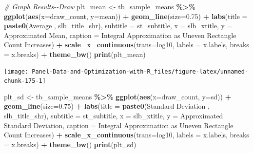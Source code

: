 \documentclass[
]{book}
\newenvironment{Shaded}{\begin{snugshade}}{\end{snugshade}}
\newcommand{\CommentTok}[1]{\textcolor[rgb]{0.56,0.35,0.01}{\textit{#1}}}
\newcommand{\DataTypeTok}[1]{\textcolor[rgb]{0.13,0.29,0.53}{#1}}
\newcommand{\FloatTok}[1]{\textcolor[rgb]{0.00,0.00,0.81}{#1}}
\newcommand{\KeywordTok}[1]{\textcolor[rgb]{0.13,0.29,0.53}{\textbf{#1}}}
\newcommand{\NormalTok}[1]{#1}
\newcommand{\OperatorTok}[1]{\textcolor[rgb]{0.81,0.36,0.00}{\textbf{#1}}}
\newcommand{\StringTok}[1]{\textcolor[rgb]{0.31,0.60,0.02}{#1}}
\begin{document}
\begin{Shaded}
\begin{Highlighting}[]
\CommentTok{\# Graph Results{-}{-}Draw}
\NormalTok{plt\_mean \textless{}{-}}\StringTok{ }\NormalTok{tb\_sample\_means }\OperatorTok{\%\textgreater{}\%}
\StringTok{  }\KeywordTok{ggplot}\NormalTok{(}\KeywordTok{aes}\NormalTok{(}\DataTypeTok{x=}\NormalTok{draw\_count, }\DataTypeTok{y=}\NormalTok{mean)) }\OperatorTok{+}
\StringTok{  }\KeywordTok{geom\_line}\NormalTok{(}\DataTypeTok{size=}\FloatTok{0.75}\NormalTok{) }\OperatorTok{+}
\StringTok{  }\KeywordTok{labs}\NormalTok{(}\DataTypeTok{title =} \KeywordTok{paste0}\NormalTok{(}\StringTok{\textquotesingle{}Average \textquotesingle{}}\NormalTok{, slb\_title\_shr),}
       \DataTypeTok{subtitle =}\NormalTok{ st\_subtitle,}
       \DataTypeTok{x =}\NormalTok{ slb\_xtitle,}
       \DataTypeTok{y =} \StringTok{\textquotesingle{}Approximated Mean\textquotesingle{}}\NormalTok{,}
       \DataTypeTok{caption =} \StringTok{\textquotesingle{}Integral Approximation as Uneven Rectangle Count Increases\textquotesingle{}}\NormalTok{) }\OperatorTok{+}
\StringTok{  }\KeywordTok{scale\_x\_continuous}\NormalTok{(}\DataTypeTok{trans=}\StringTok{\textquotesingle{}log10\textquotesingle{}}\NormalTok{, }\DataTypeTok{labels =}\NormalTok{ x.labels, }\DataTypeTok{breaks =}\NormalTok{ x.breaks) }\OperatorTok{+}
\StringTok{  }\KeywordTok{theme\_bw}\NormalTok{()}
\KeywordTok{print}\NormalTok{(plt\_mean)}
\end{Highlighting}
\end{Shaded}

\begin{center}\texttt{[image: Panel-Data-and-Optimization-with-R\_files/figure-latex/unnamed-chunk-175-1]} \end{center}

\begin{Shaded}
\begin{Highlighting}[]
\NormalTok{plt\_sd \textless{}{-}}\StringTok{ }\NormalTok{tb\_sample\_means }\OperatorTok{\%\textgreater{}\%}
\StringTok{  }\KeywordTok{ggplot}\NormalTok{(}\KeywordTok{aes}\NormalTok{(}\DataTypeTok{x=}\NormalTok{draw\_count, }\DataTypeTok{y=}\NormalTok{sd)) }\OperatorTok{+}
\StringTok{  }\KeywordTok{geom\_line}\NormalTok{(}\DataTypeTok{size=}\FloatTok{0.75}\NormalTok{) }\OperatorTok{+}
\StringTok{  }\KeywordTok{labs}\NormalTok{(}\DataTypeTok{title =} \KeywordTok{paste0}\NormalTok{(}\StringTok{\textquotesingle{}Standard Deviation \textquotesingle{}}\NormalTok{, slb\_title\_shr),}
       \DataTypeTok{subtitle =}\NormalTok{ st\_subtitle,}
       \DataTypeTok{x =}\NormalTok{ slb\_xtitle,}
       \DataTypeTok{y =} \StringTok{\textquotesingle{}Approximated Standard Deviation\textquotesingle{}}\NormalTok{,}
       \DataTypeTok{caption =} \StringTok{\textquotesingle{}Integral Approximation as Uneven Rectangle Count Increases\textquotesingle{}}\NormalTok{) }\OperatorTok{+}
\StringTok{  }\KeywordTok{scale\_x\_continuous}\NormalTok{(}\DataTypeTok{trans=}\StringTok{\textquotesingle{}log10\textquotesingle{}}\NormalTok{, }\DataTypeTok{labels =}\NormalTok{ x.labels, }\DataTypeTok{breaks =}\NormalTok{ x.breaks) }\OperatorTok{+}
\StringTok{  }\KeywordTok{theme\_bw}\NormalTok{()}
\KeywordTok{print}\NormalTok{(plt\_sd)}
\end{Highlighting}
\end{Shaded}
\end{document}
